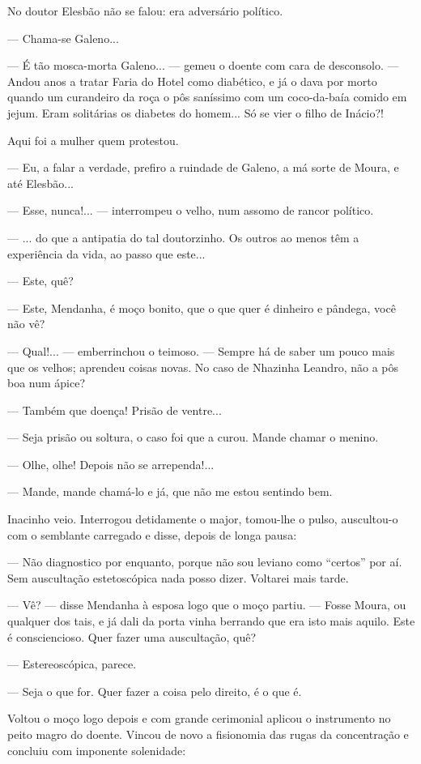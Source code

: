 No doutor Elesbão não se falou: era adversário político.

--- Chama-se Galeno...

--- É tão mosca-morta Galeno... --- gemeu o doente com cara de
desconsolo. --- Andou anos a tratar Faria do Hotel como diabético, e já
o dava por morto quando um curandeiro da roça o pôs saníssimo com um
coco-da-baía comido em jejum. Eram solitárias os diabetes do homem... Só
se vier o filho de Inácio?!

Aqui foi a mulher quem protestou.

--- Eu, a falar a verdade, prefiro a ruindade de Galeno, a má sorte de
Moura, e até Elesbão...

--- Esse, nunca!... --- interrompeu o velho, num assomo de rancor
político.

--- ... do que a antipatia do tal doutorzinho. Os outros ao menos têm a
experiência da vida, ao passo que este...

--- Este, quê?

--- Este, Mendanha, é moço bonito, que o que quer é dinheiro e pândega,
você não vê?

--- Qual!... --- emberrinchou o teimoso. --- Sempre há de saber um pouco
mais que os velhos; aprendeu coisas novas. No caso de Nhazinha Leandro,
não a pôs boa num ápice?

--- Também que doença! Prisão de ventre...

--- Seja prisão ou soltura, o caso foi que a curou. Mande chamar o
menino.

--- Olhe, olhe! Depois não se arrependa!...

--- Mande, mande chamá-lo e já, que não me estou sentindo bem.

Inacinho veio. Interrogou detidamente o major, tomou-lhe o pulso,
auscultou-o com o semblante carregado e disse, depois de longa pausa:

--- Não diagnostico por enquanto, porque não sou leviano como ``certos''
por aí. Sem auscultação estetoscópica nada posso dizer. Voltarei mais
tarde.

--- Vê? --- disse Mendanha à esposa logo que o moço partiu. --- Fosse
Moura, ou qualquer dos tais, e já dali da porta vinha berrando que era
isto mais aquilo. Este é consciencioso. Quer fazer uma auscultação, quê?

--- Estereoscópica, parece.

--- Seja o que for. Quer fazer a coisa pelo direito, é o que é.

Voltou o moço logo depois e com grande cerimonial aplicou o instrumento
no peito magro do doente. Vincou de novo a fisionomia das rugas da
concentração e concluiu com imponente solenidade:

